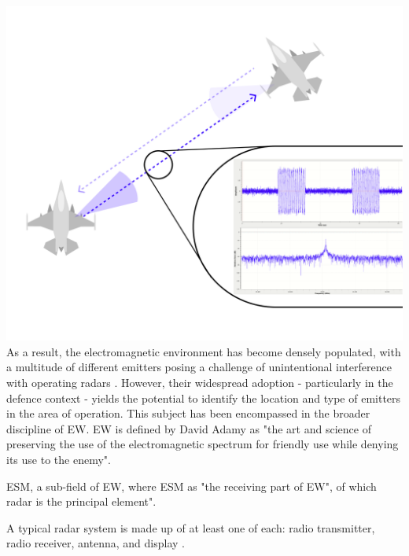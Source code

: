 \includegraphics[width=\textwidth]{Figures/Senario_ Single Radar; single signal.png}
As a result, the electromagnetic environment has become densely populated, with a multitude of different emitters posing a challenge of unintentional interference with operating radars \cite{degering_invention_2018}.
However, their widespread adoption - particularly in the defence context - yields the potential to identify the location and type of emitters in the area of operation.
This subject has been encompassed in the broader discipline of \ac{EW}. \ac{EW} is defined by David Adamy \cite{adamy_13_2001} as "the art and science of preserving the use of the electromagnetic spectrum for friendly use while denying its use to the enemy".

\ac{ESM}, a sub-field of \ac{EW}, where \ac{ESM} as "the receiving part of EW"\cite{adamy_13_2001}, of which radar is the principal element".




A typical radar system is made up of at least one of each: radio transmitter, radio receiver, antenna, and display \cite{stimson_introduction_1998}. %


